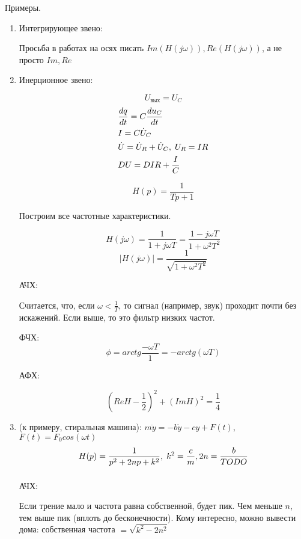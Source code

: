 \documentclass[main.tex]{subfiles}
\begin{document}
Примеры.

\begin{enumerate}[noitemsep]
	\item Интегрирующее звено:
	
	\begin{leftbar}
		Просьба в работах на осях писать $ Im(H(j\omega)), Re(H(j\omega))  $, а не просто $ Im, Re $
	\end{leftbar}
	
	\item Инерционное звено:
	
	$$ U_{\text{вых}} = U_C $$
	\begin{align*}
		& \frac{dq}{dt} = C\frac{du_C}{dt} \\
		& I = C \dot U_C \\
		& \dot U = \dot U_R + \dot U_C, \thickspace U_R = IR \\
		& DU = DIR + \frac{I}{C} \\
	\end{align*}
	
	$$ \boxed{H(p) = \frac{1}{Tp + 1}} $$
	
	Построим все частотные характеристики.
	
	$$ H(j\omega) = \frac{1}{1 + j \omega T} = \frac{1 - j \omega T}{1 + \omega^2 T^2} $$
	$$ |H(j \omega)| = \frac{1}{\sqrt{1 + \omega^2 T^2}} $$
	
	АЧХ:
	
	
	Считается, что, если $ \omega < \frac{1}{T} $, то сигнал (например, звук) проходит почти без искажений.
	Если выше, то это фильтр низких частот.
	
	ФЧХ:
	$$ \phi = arctg \frac{- \omega T}{1} = -arctg(\omega T) $$
	
	
	АФХ:
	
	
	$$ (Re H - \frac{1}{2})^2 + (Im H)^2 = \frac{1}{4} $$

\item (к примеру, стиральная машина):
$ m \ddot y = -b \dot y - c y + F(t) $, $ F(t) = F_0 cos(\omega t) $
$$ H(p) = \frac{1}{p^2 + 2np + k^2}, \thickspace k^2 = \frac{c}{m}, 2n = \frac{b}{TODO} $$
$$ $$

АЧХ:

Если трение мало и частота равна собственной, будет пик.
Чем меньше $ n $, тем выше пик (вплоть до бесконечности).
Кому интересно, можно вывести дома: собственная частота $ = \sqrt{k^2 - 2n^2} $


\end{enumerate}
\end{document}
